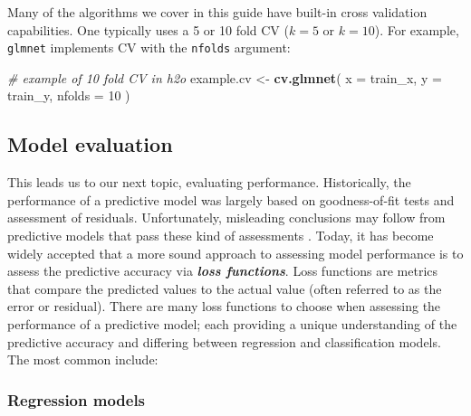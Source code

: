 \documentclass[]{book}
\newenvironment{Shaded}{\begin{snugshade}}{\end{snugshade}}
\newcommand{\CommentTok}[1]{\textcolor[rgb]{0.56,0.35,0.01}{\textit{#1}}}
\newcommand{\DataTypeTok}[1]{\textcolor[rgb]{0.13,0.29,0.53}{#1}}
\newcommand{\DecValTok}[1]{\textcolor[rgb]{0.00,0.00,0.81}{#1}}
\newcommand{\KeywordTok}[1]{\textcolor[rgb]{0.13,0.29,0.53}{\textbf{#1}}}
\newcommand{\NormalTok}[1]{#1}
\newcommand{\StringTok}[1]{\textcolor[rgb]{0.31,0.60,0.02}{#1}}
\theoremstyle{definition}
\theoremstyle{definition}
\theoremstyle{definition}
\theoremstyle{remark}
\begin{document}
Many of the algorithms we cover in this guide have built-in cross
validation capabilities. One typically uses a 5 or 10 fold CV (\(k = 5\)
or \(k = 10\)). For example, \texttt{glmnet} implements CV with the
\texttt{nfolds} argument:

\begin{Shaded}
\begin{Highlighting}[]
\CommentTok{# example of 10 fold CV in h2o}
\NormalTok{example.cv <-}\StringTok{ }\KeywordTok{cv.glmnet}\NormalTok{(}
  \DataTypeTok{x =}\NormalTok{ train_x,}
  \DataTypeTok{y =}\NormalTok{ train_y,}
  \DataTypeTok{nfolds =} \DecValTok{10}
\NormalTok{)}
\end{Highlighting}
\end{Shaded}

\hypertarget{reg-perf-eval}{%
\subsection{Model evaluation}\label{reg-perf-eval}}

This leads us to our next topic, evaluating performance. Historically,
the performance of a predictive model was largely based on
goodness-of-fit tests and assessment of residuals. Unfortunately,
misleading conclusions may follow from predictive models that pass these
kind of assessments \citep{breiman2001statistical}. Today, it has become
widely accepted that a more sound approach to assessing model
performance is to assess the predictive accuracy via \textbf{\emph{loss
functions}}. Loss functions are metrics that compare the predicted
values to the actual value (often referred to as the error or residual).
There are many loss functions to choose when assessing the performance
of a predictive model; each providing a unique understanding of the
predictive accuracy and differing between regression and classification
models. The most common include:

\hypertarget{regression-models}{%
\subsubsection{Regression models}\label{regression-models}}
\end{document}
